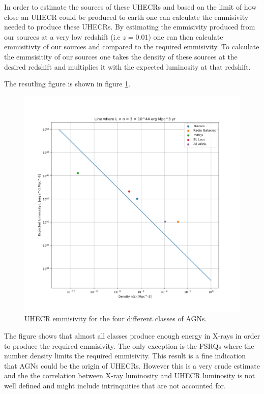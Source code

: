 \documentclass{article}
\begin{document}
In order to estimate the sources of these UHECRs and based on the limit of how close an UHECR could be produced to earth one can calculate the emmisivity needed to produce these UHECRs.
By estimating the emmisivity produced from our sources at a very low redshift (i.e $z=0.01$) one can then calculate emmisitivty of our sources and compared to the required emmisivity.
To calculate the emmsisitity of our sources one takes the density of these sources at the desired redshift and multiplies it with the expected luminosity at that redshift.

The resutling figure is shown in figure \ref{fig:UHECR}.

\begin{figure}
    \centering
    \includegraphics[width = \textwidth]{L_n_line.png}
    \caption{UHECR emmisivity for the four different classes of AGNs.}
    \label{fig:UHECR}
\end{figure}

The figure shows that almost all classes produce enough energy in X-rays in order to produce the required emmisivity. The only exception is the FSRQs where the number
density limits the required emmisivity. This result is a fine indication that AGNs could be the origin of UHECRs. However this is a very crude estimate and the
the correlation between X-ray luminosity and UHECR luminosity is not well defined and might include intrinquities that are not accounted for.






\end{document}
